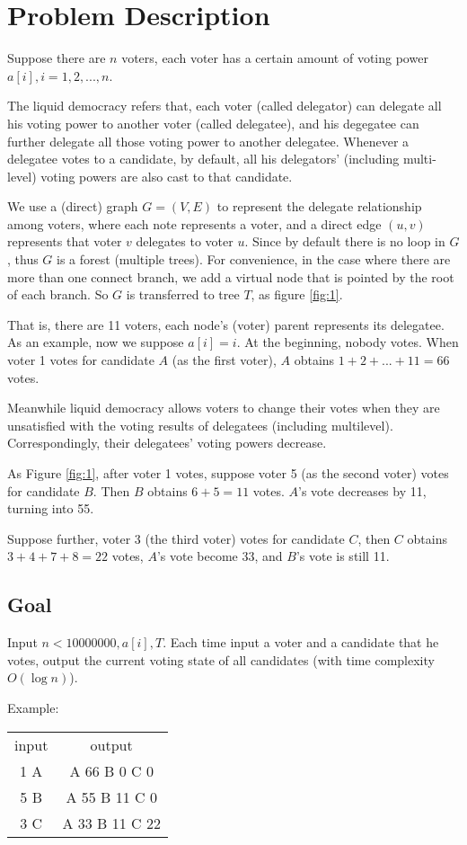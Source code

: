 \section{Problem Description}
Suppose there are $n$ voters, each voter has a certain amount of voting power $a[i],i=1,2,...,n$.

The liquid democracy refers that, each voter (called delegator) can delegate all his voting power to another voter (called delegatee), and his degegatee can further delegate all those voting power to another delegatee. Whenever a delegatee votes to a candidate, by default, all his delegators' (including multi-level) voting powers are also cast to that candidate.

We use a (direct) graph $G=(V,E)$ to represent the delegate relationship among voters, where each note represents a voter, and a direct edge $(u,v)$ represents that voter $v$ delegates to voter $u$. Since by default there is no loop in $G$, thus $G$ is a forest (multiple trees). For convenience, in the case where there are more than one connect branch, we add a virtual node that is pointed by the root of each branch. So $G$ is transferred to tree $T$, as figure \ref{fig:1}.

That is, there are 11 voters, each node's  (voter) parent represents its delegatee. As an example, now we  suppose $a[i]=i$. At the beginning, nobody votes. When voter 1 votes for candidate $A$ (as the first voter), $A$ obtains $1+2+...+11=66$ votes.

Meanwhile liquid democracy allows voters to change their votes when they are unsatisfied with the voting results of delegatees (including multilevel). Correspondingly, their delegatees' voting powers decrease.

As Figure \ref{fig:1}, after voter 1 votes, suppose voter 5 (as the second voter) votes for candidate $B$. Then $B$ obtains $6+5=11$ votes. $A$'s vote decreases by 11, turning into 55.

Suppose further, voter 3 (the third voter) votes for candidate $C$, then $C$ obtains $3+4+7+8=22$ votes, $A$'s  vote become 33, and $B$'s vote is still 11.

\begin{figure*}
  \centering
	\label{fig:1}
  
	\caption{Tree $T$}
\end{figure*}
\subsection{Goal}
Input $n<10000000,a[i],T$. Each time input a voter and a candidate that he votes, output the current voting state of all candidates (with time complexity $O(\log n)$).

Example:

\begin{tabular}{|c|c|}
input & output \\
1 A			&		A 66 B 0 C 0
\\
5 B			&		A 55 B 11 C 0
\\
3 C			&		A 33 B 11 C 22
\end{tabular}


